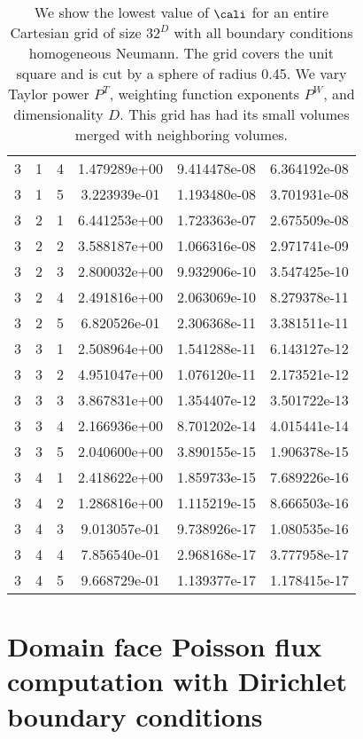 \documentclass{article}
\begin{document}
{\begin{small}
\begin{table}
\begin{center}
\begin{tabular}{|ccc|ccc|}
3 & 1 & 4 &  1.479289e+00 & 9.414478e-08 & 6.364192e-08 \\
3 & 1 & 5 &  3.223939e-01 & 1.193480e-08 & 3.701931e-08 \\
3 & 2 & 1 &  6.441253e+00 & 1.723363e-07 & 2.675509e-08 \\
3 & 2 & 2 &  3.588187e+00 & 1.066316e-08 & 2.971741e-09 \\
3 & 2 & 3 &  2.800032e+00 & 9.932906e-10 & 3.547425e-10 \\
3 & 2 & 4 &  2.491816e+00 & 2.063069e-10 & 8.279378e-11 \\
3 & 2 & 5 &  6.820526e-01 & 2.306368e-11 & 3.381511e-11 \\
3 & 3 & 1 &  2.508964e+00 & 1.541288e-11 & 6.143127e-12 \\
3 & 3 & 2 &  4.951047e+00 & 1.076120e-11 & 2.173521e-12 \\
3 & 3 & 3 &  3.867831e+00 & 1.354407e-12 & 3.501722e-13 \\
3 & 3 & 4 &  2.166936e+00 & 8.701202e-14 & 4.015441e-14 \\
3 & 3 & 5 &  2.040600e+00 & 3.890155e-15 & 1.906378e-15 \\
3 & 4 & 1 &  2.418622e+00 & 1.859733e-15 & 7.689226e-16 \\
3 & 4 & 2 &  1.286816e+00 & 1.115219e-15 & 8.666503e-16 \\
3 & 4 & 3 &  9.013057e-01 & 9.738926e-17 & 1.080535e-16 \\
3 & 4 & 4 &  7.856540e-01 & 2.968168e-17 & 3.777958e-17 \\
3 & 4 & 5 &  9.668729e-01 & 1.139377e-17 & 1.178415e-17 \\
\hline
\end{tabular}
\end{center}
\label{fig::mergedSolvability}
\caption
    {
      We show the lowest value of
      $\cali$ for an entire Cartesian grid of size $32^D$
      with all
      boundary conditions homogeneous Neumann.
      The grid covers the unit square and is cut by a sphere of radius 0.45.
      We vary Taylor power $P^T$, weighting
      function exponents $P^W$, and dimensionality $D$.    This grid
      has had its small volumes merged with neighboring volumes.
    }
\end{table}
\end{small}


\section{Domain face Poisson flux computation with Dirichlet boundary
  conditions}

}
\end{document}
